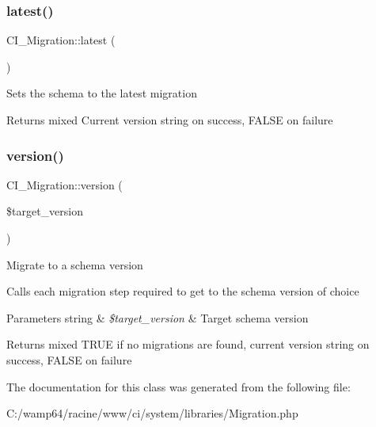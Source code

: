 \subsubsection{\texorpdfstring{latest()}{latest()}}
{\footnotesize\ttfamily C\+I\+\_\+\+Migration\+::latest (\begin{DoxyParamCaption}{ }\end{DoxyParamCaption})}

Sets the schema to the latest migration

\begin{DoxyReturn}{Returns}
mixed Current version string on success, F\+A\+L\+SE on failure 
\end{DoxyReturn}
\mbox{\label{class_c_i___migration_a6d6f818633387d1a42bd5ae7e1f74a9a}} 
\subsubsection{\texorpdfstring{version()}{version()}}
{\footnotesize\ttfamily C\+I\+\_\+\+Migration\+::version (\begin{DoxyParamCaption}\item[{}]{\$target\+\_\+version }\end{DoxyParamCaption})}

Migrate to a schema version

Calls each migration step required to get to the schema version of choice


\begin{DoxyParams}[1]{Parameters}
string & {\em \$target\+\_\+version} & Target schema version \\
\hline
\end{DoxyParams}
\begin{DoxyReturn}{Returns}
mixed T\+R\+UE if no migrations are found, current version string on success, F\+A\+L\+SE on failure 
\end{DoxyReturn}


The documentation for this class was generated from the following file\+:\begin{DoxyCompactItemize}
\item 
C\+:/wamp64/racine/www/ci/system/libraries/Migration.\+php\end{DoxyCompactItemize}
